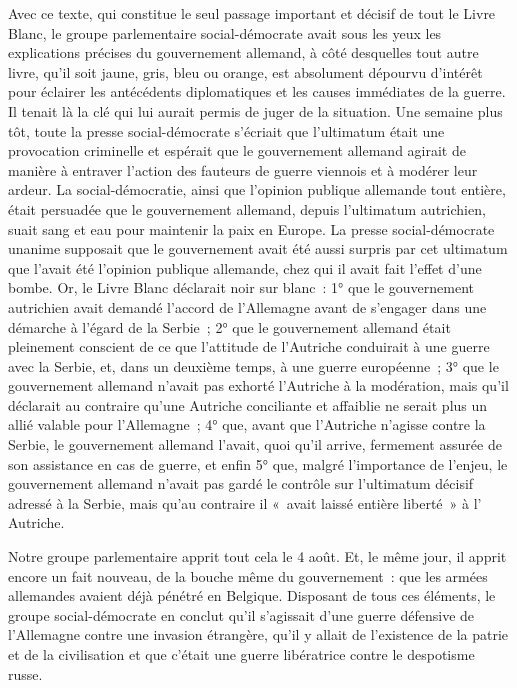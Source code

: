 \documentclass[french,twoside]{book} %
\begin{document}
\noindent Avec ce texte, qui constitue le seul passage important et décisif de tout le Livre Blanc, le groupe parlementaire social-démocrate avait sous les yeux les explications précises du gouvernement allemand, à côté desquelles tout autre livre, qu’il soit jaune, gris, bleu ou orange, est absolument dépourvu d’intérêt pour éclairer les antécédents diplomatiques et les causes immédiates de la guerre. Il tenait là la clé qui lui aurait permis de juger de la situation. Une semaine plus tôt, toute la presse social-démocrate s’écriait que l’ultimatum était une provocation criminelle et espérait que le gouvernement allemand agirait de manière à entraver l’action des fauteurs de guerre viennois et à modérer leur ardeur. La social-démocratie, ainsi que l’opinion publique allemande tout entière, était persuadée que le gouvernement allemand, depuis l’ultimatum autrichien, suait sang et eau pour maintenir la paix en Europe. La presse social-démocrate unanime supposait que le gouvernement avait été aussi surpris par cet ultimatum que l’avait été l’opinion publique allemande, chez qui il avait fait l’effet d’une bombe. Or, le Livre Blanc déclarait noir sur blanc : 1° que le gouvernement autrichien avait demandé l’accord de l’Allemagne avant de s’engager dans une démarche à l’égard de la Serbie ; 2° que le gouvernement allemand était pleinement conscient de ce que l’attitude de l’Autriche conduirait à une guerre avec la Serbie, et, dans un deuxième temps, à une guerre européenne ; 3° que le gouvernement allemand n’avait pas exhorté l’Autriche à la modération, mais qu’il déclarait au contraire qu’une Autriche conciliante et affaiblie ne serait plus un allié valable pour l’Allemagne ; 4° que, avant que l’Autriche n’agisse contre la Serbie, le gouvernement allemand l’avait, quoi qu’il arrive, fermement assurée de son assistance en cas de guerre, et enfin 5° que, malgré l’importance de l’enjeu, le gouvernement allemand n’avait pas gardé le contrôle sur l’ultimatum décisif adressé à la Serbie, mais qu’au contraire il « avait laissé entière liberté » à l’ Autriche.\par
Notre groupe parlementaire apprit tout cela le 4 août. Et, le même jour, il apprit encore un fait nouveau, de la bouche même du gouvernement : que les armées allemandes avaient déjà pénétré en Belgique. Disposant de tous ces éléments, le groupe social-démocrate en conclut qu’il s’agissait d’une guerre défensive de l’Allemagne contre une invasion étrangère, qu’il y allait de l’existence de la patrie et de la civilisation et que c’était une guerre libératrice contre le despotisme russe.\par
\end{document}
